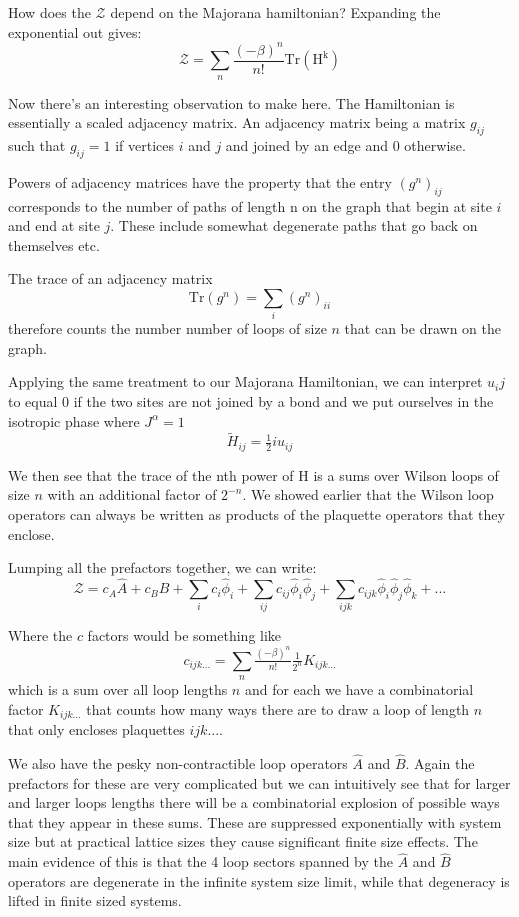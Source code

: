 How does the \(\mathcal{Z}\) depend on the Majorana hamiltonian? Expanding the exponential out gives: \[ \mathcal{Z} = \sum_n \frac{(-\beta)^n}{n!} \mathrm{Tr(H^k)} \]

Now there's an interesting observation to make here. The Hamiltonian is essentially a scaled adjacency matrix. An adjacency matrix being a matrix \(g_{ij}\) such that \(g_{ij} = 1\) if vertices \(i\) and \(j\) and joined by an edge and 0 otherwise.

Powers of adjacency matrices have the property that the entry \((g^n)_{ij}\) corresponds to the number of paths of length n on the graph that begin at site \(i\) and end at site \(j\). These include somewhat degenerate paths that go back on themselves etc.

The trace of an adjacency matrix \[\mathrm{Tr}(g^n) = \sum_i (g^n)_{ii}\] therefore counts the number number of loops of size \(n\) that can be drawn on the graph.

Applying the same treatment to our Majorana Hamiltonian, we can interpret \(u_ij\) to equal 0 if the two sites are not joined by a bond and we put ourselves in the isotropic phase where \(J^\alpha = 1\) \[ \tilde{H}_{ij} =  \tfrac{1}{2} i u_{ij}\]

We then see that the trace of the nth power of H is a sums over Wilson loops of size \(n\) with an additional factor of \(2^{-n}\). We showed earlier that the Wilson loop operators can always be written as products of the plaquette operators that they enclose.

Lumping all the prefactors together, we can write: \[ \mathcal{Z} = c_A \hat{A} + c_B \hat{B} + \sum_i c_i \hat{\phi}_i + \sum_{ij} c_{ij}  \hat{\phi}_i \hat{\phi}_j + \sum_{ijk} c_{ijk}  \hat{\phi}_i \hat{\phi}_j \hat{\phi}_k + ...\]

Where the \(c\) factors would be something like \[c_{ijk...} = \sum_n \tfrac{(-\beta)^n}{n!} \tfrac{1}{2^n} K_{ijk...}\] which is a sum over all loop lengths \(n\) and for each we have a combinatorial factor \(K_{ijk...}\) that counts how many ways there are to draw a loop of length \(n\) that only encloses plaquettes \(ijk...\).

We also have the pesky non-contractible loop operators \(\hat{A}\) and \(\hat{B}\). Again the prefactors for these are very complicated but we can intuitively see that for larger and larger loops lengths there will be a combinatorial explosion of possible ways that they appear in these sums. These are suppressed exponentially with system size but at practical lattice sizes they cause significant finite size effects. The main evidence of this is that the 4 loop sectors spanned by the \(\hat{A}\) and \(\hat{B}\) operators are degenerate in the infinite system size limit, while that degeneracy is lifted in finite sized systems.


